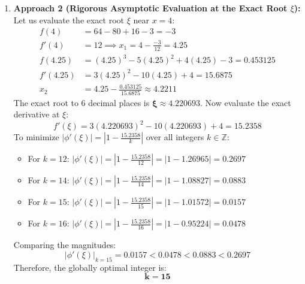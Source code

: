 \documentclass[11pt,a4paper]{article}
\numberwithin{equation}{section}
\begin{document}
\begin{solbox}
\begin{enumerate}[leftmargin=2em]
    \item \textbf{Approach 2 (Rigorous Asymptotic Evaluation at the Exact Root $\xi$):} \\
    Let us evaluate the exact root $\xi$ near $x = 4$:
    \begin{align}
        f(4) &= 64 - 80 + 16 - 3 = -3 \\
        f'(4) &= 12 \implies x_1 = 4 - \frac{-3}{12} = 4.25 \\
        f(4.25) &= (4.25)^3 - 5(4.25)^2 + 4(4.25) - 3 = 0.453125 \\
        f'(4.25) &= 3(4.25)^2 - 10(4.25) + 4 = 15.6875 \\
        x_2 &= 4.25 - \frac{0.453125}{15.6875} \approx 4.2211
    \end{align}
    The exact root to 6 decimal places is $\mathbf{\xi \approx 4.220693}$.
    Now evaluate the exact derivative at $\xi$:
    \begin{equation}
        f'(\xi) = 3(4.220693)^2 - 10(4.220693) + 4 = \mathbf{15.2358}
    \end{equation}
    To minimize $|\phi'(\xi)| = \left| 1 - \frac{15.2358}{k} \right|$ over all integers $k \in \mathbb{Z}$:
    \begin{itemize}
        \item For $k = 12$: $|\phi'(\xi)| = \left| 1 - \frac{15.2358}{12} \right| = |1 - 1.26965| = \mathbf{0.2697}$
        \item For $k = 14$: $|\phi'(\xi)| = \left| 1 - \frac{15.2358}{14} \right| = |1 - 1.08827| = \mathbf{0.0883}$
        \item For $k = 15$: $|\phi'(\xi)| = \left| 1 - \frac{15.2358}{15} \right| = |1 - 1.01572| = \mathbf{0.0157}$
        \item For $k = 16$: $|\phi'(\xi)| = \left| 1 - \frac{15.2358}{16} \right| = |1 - 0.95224| = \mathbf{0.0478}$
    \end{itemize}
    Comparing the magnitudes:
    \begin{equation}
        |\phi'(\xi)|_{k=15} = 0.0157 < 0.0478 < 0.0883 < 0.2697
    \end{equation}
    Therefore, the globally optimal integer is:
    \begin{equation}
        \mathbf{k = 15}
    \end{equation}
\end{enumerate}


\end{solbox}
\end{document}
